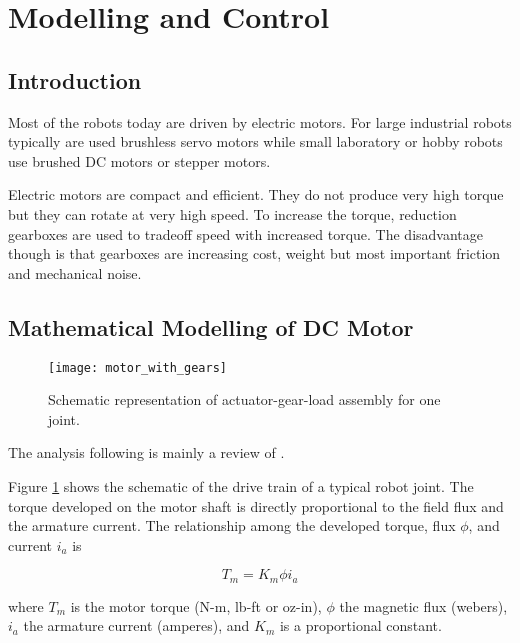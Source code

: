 \newpage


\section{Modelling and Control}

\subsection{Introduction}

Most of the robots today are driven by electric motors. For large industrial robots typically are used brushless servo motors while small laboratory or hobby robots use brushed DC motors or stepper motors.

Electric motors are compact and efficient. They do not produce very high torque but they can rotate at very high speed. To increase the torque, reduction gearboxes are used to tradeoff speed with increased torque. The disadvantage though is that gearboxes are increasing cost, weight but most important friction and mechanical noise.

\subsection{Mathematical Modelling of DC Motor}\label{sub:modeling}

\begin{figure}[b]
	\begin{center}
		\texttt{[image: motor\_with\_gears]}
	\caption{Schematic representation of actuator-gear-load assembly for one joint.}
	\label{Fig:motor}
	\end{center}
\end{figure}

The analysis following is mainly a review of \cite{Modeling}.

Figure \ref{Fig:motor} shows the schematic of the drive train of a typical robot joint. The torque developed on the motor shaft is directly proportional to the field flux and the armature current. The relationship among the developed torque, flux $\phi$, and current $i_a$ is

\begin{equation}
	T_m = K_m \phi i_a
	\label{Eq:torque}
\end{equation}

\noindent where $T_m$ is the motor torque (N-m, lb-ft or oz-in), $\phi$ the magnetic flux (webers), $i_a$ the armature current (amperes), and $K_m$ is a proportional constant.

